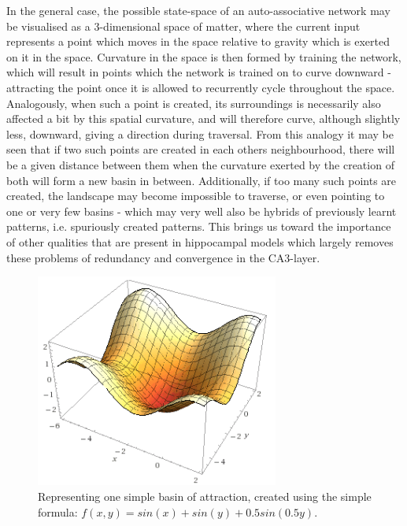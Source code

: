 In the general case, the possible state-space of an auto-associative network may be visualised as a 3-dimensional space of matter, where the current input represents a point which moves in the space relative to gravity which is exerted on it in the space. Curvature in the space is then formed by training the network, which will result in points which the network is trained on to curve downward - attracting the point once it is allowed to recurrently cycle throughout the space. Analogously, when such a point is created, its surroundings is necessarily also affected a bit by this spatial curvature, and will therefore curve, although slightly less, downward, giving a direction during traversal. From this analogy it may be seen that if two such points are created in each others neighbourhood, there will be a given distance between them when the curvature exerted by the creation of both will form a new basin in between. Additionally, if too many such points are created, the landscape may become impossible to traverse, or even pointing to one or very few basins - which may very well also be hybrids of previously learnt patterns, i.e. spuriously created patterns.
This brings us toward the importance of other qualities that are present in hippocampal models which largely removes these problems of redundancy and convergence in the CA3-layer.

\begin{figure}
    \centering
    \includegraphics[width=8cm]{fig/simple-basin.png}
    \caption{Representing one simple basin of attraction, created using the simple formula: $f(x,y) = sin(x) + sin(y) + 0.5 sin(0.5 y)$.}
    \label{fig:simple-basin}
\end{figure}

